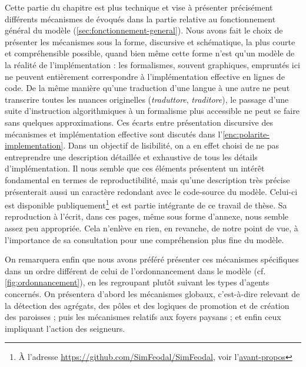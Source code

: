 Cette partie du chapitre est plus technique et vise à présenter précisément différents mécanismes de \simfeodal{} évoqués dans la partie relative au fonctionnement général du modèle (\cref{sec:fonctionnement-general}).
Nous avons fait le choix de présenter les mécanismes sous la forme, discursive et schématique, la plus courte et compréhensible possible, quand bien même cette forme n'est qu'un \og modèle\fg{} de la réalité de l'implémentation : les formalismes, souvent graphiques, empruntés ici ne peuvent entièrement correspondre à l'implémentation effective en lignes de code.
De la même manière qu'une traduction d'une langue à une autre ne peut transcrire toutes les nuances originelles (\textit{traduttore}, \textit{traditore}), le passage d'une suite d'instruction algorithmiques à un formalisme plus accessible ne peut se faire sans quelques approximations.
Ces écarts entre présentation discursive des mécanismes et implémentation effective sont discutés dans l'\cref{enc:polarite-implementation}.
Dans un objectif de lisibilité, on a en effet choisi de ne pas entreprendre une description détaillée et exhaustive de tous les détails d'implémentation.
Il nous semble que ces éléments présentent un intérêt fondamental en termes de reproductibilité, mais qu'une description très précise présenterait aussi un caractère redondant avec le code-source du modèle.
Celui-ci est disponible publiquement\footnote{
	À l'adresse \href{https://github.com/SimFeodal/SimFeodal}{https://github.com/SimFeodal/SimFeodal}, voir l'\hyperlink{avant-propos}{avant-propos}
} et est partie intégrante de ce travail de thèse.
Sa reproduction à l'écrit, dans ces pages, même sous forme d'annexe, nous semble assez peu appropriée.
Cela n'enlève en rien, en revanche, de notre point de vue, à l'importance de sa consultation pour une compréhension plus fine du modèle.


On remarquera enfin que nous avons préféré présenter ces mécanismes spécifiques dans un ordre différent de celui de l'ordonnancement dans le modèle (cf. \cref{fig:ordonnancement}), en les regroupant plutôt suivant les types d'agents concernés.
On présentera d'abord les mécanismes \og globaux\fg{}, c'est-à-dire relevant de la détection des agrégats, des pôles et des logiques de promotion et de création des paroisses ; puis les mécanismes relatifs aux foyers paysans ; et enfin ceux impliquant l'action des seigneurs.

